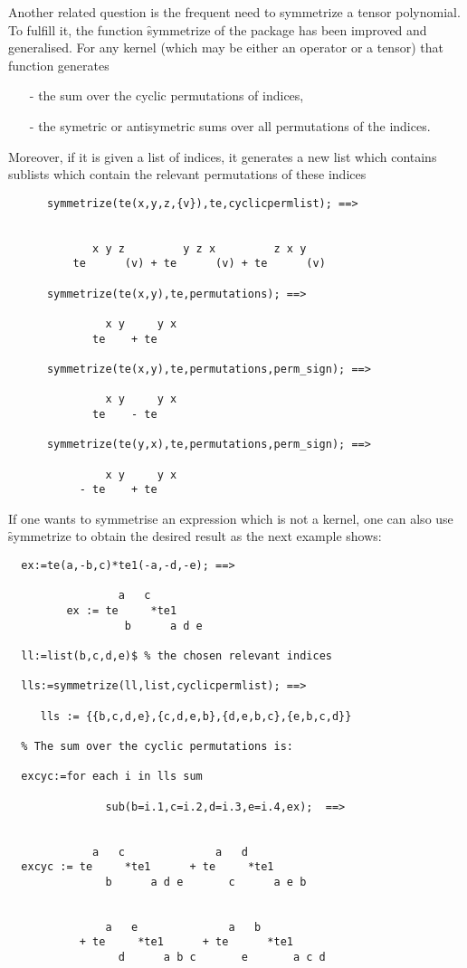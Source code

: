 Another related question is the frequent need to symmetrize
a tensor polynomial.
To fulfill it, the function \f{symmetrize}
of the package  has been improved and
generalised. For any kernel (which may be either
an operator or a tensor) that function generates
\begin{itemize}
\item[-] the sum over the cyclic permutations of indices,
\item[-] the symetric or antisymetric sums over all permutations
of the  indices.
\end{itemize}
Moreover, if it is given a list of indices, it generates a new list
which contains sublists which contain  the relevant permutations of
these indices
\begin{verbatim}
      symmetrize(te(x,y,z,{v}),te,cyclicpermlist); ==>


             x y z         y z x         z x y
          te      (v) + te      (v) + te      (v)

      symmetrize(te(x,y),te,permutations); ==>

               x y     y x
             te    + te

      symmetrize(te(x,y),te,permutations,perm_sign); ==>

               x y     y x
             te    - te

      symmetrize(te(y,x),te,permutations,perm_sign); ==>

               x y     y x
           - te    + te
\end{verbatim}
If one wants to symmetrise an expression which is not a kernel, one
can also use \f{symmetrize} to obtain the desired result as the next
example shows:
\begin{verbatim}
  ex:=te(a,-b,c)*te1(-a,-d,-e); ==>

                 a   c
         ex := te     *te1
                  b      a d e

  ll:=list(b,c,d,e)$ % the chosen relevant indices

  lls:=symmetrize(ll,list,cyclicpermlist); ==>

     lls := {{b,c,d,e},{c,d,e,b},{d,e,b,c},{e,b,c,d}}

  % The sum over the cyclic permutations is:

  excyc:=for each i in lls sum

               sub(b=i.1,c=i.2,d=i.3,e=i.4,ex);  ==>


             a   c              a   d
  excyc := te     *te1      + te     *te1
               b      a d e       c      a e b


               a   e              a   b
           + te     *te1      + te      *te1
                 d      a b c       e       a c d
\end{verbatim}

